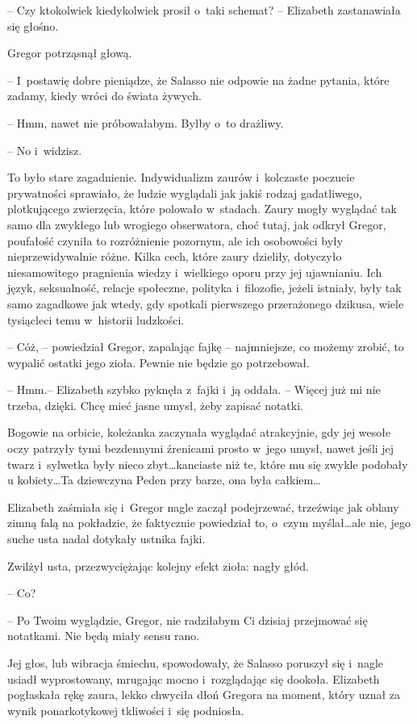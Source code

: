 \documentclass[oneside,polish,12pt,sfheadings]{mwbk}
\begin{document}
-- Czy ktokolwiek kiedykolwiek prosił o~taki schemat? -- Elizabeth
zastanawiała się głośno.

Gregor potrząsnął głową. 

-- I~postawię dobre pieniądze, że Salasso nie
odpowie na żadne pytania, które zadamy, kiedy wróci do świata żywych.

-- Hmm, nawet nie próbowałabym. Byłby o~to drażliwy.

-- No i~widzisz.

To było stare zagadnienie. Indywidualizm zaurów i~kolczaste poczucie
prywatności sprawiało, że ludzie wyglądali jak jakiś rodzaj gadatliwego,
plotkującego zwierzęcia, które polowało w~stadach. Zaury mogły wyglądać
tak samo dla zwykłego lub wrogiego obserwatora, choć tutaj, jak odkrył
Gregor, poufałość czyniła to rozróżnienie pozornym, ale ich osobowości
były nieprzewidywalnie różne. Kilka cech, które zaury dzieliły,
dotyczyło niesamowitego pragnienia wiedzy i~wielkiego oporu przy jej
ujawnianiu. Ich język, seksualność, relacje społeczne, polityka i~filozofie, jeżeli istniały, były tak samo zagadkowe jak wtedy, gdy
spotkali pierwszego przerażonego dzikusa, wiele tysiącleci temu w~historii ludzkości.

-- Cóż, -- powiedział Gregor, zapalając fajkę -- najmniejsze, co możemy
zrobić, to wypalić ostatki jego zioła. Pewnie nie będzie go potrzebował.

-- Hmm.-- Elizabeth szybko pyknęła z~fajki i~ją oddała. -- Więcej już mi
nie trzeba, dzięki. Chcę mieć jasne umysł, żeby zapisać notatki.

Bogowie na orbicie, koleżanka zaczynała wyglądać atrakcyjnie, gdy jej
wesołe oczy patrzyły tymi bezdennymi źrenicami prosto w~jego umysł,
nawet jeśli jej twarz i~sylwetka były nieco zbyt\ldots kanciaste niż te,
które mu się zwykle podobały u kobiety\ldots Ta dziewczyna Peden przy
barze, ona była całkiem\ldots

Elizabeth zaśmiała się i~Gregor nagle zaczął podejrzewać, trzeźwiąc jak
oblany zimną falą na pokładzie, że faktycznie powiedział to, o~czym
myślał\ldots ale nie, jego suche usta nadal dotykały ustnika fajki.

Zwilżył usta, przezwyciężając kolejny efekt zioła: nagły głód. 

-- Co?

-- Po Twoim wyglądzie, Gregor, nie radziłabym Ci dzisiaj przejmować się
notatkami. Nie będą miały sensu rano.

Jej głos, lub wibracja śmiechu, spowodowały, że Salasso poruszył się i~nagle usiadł wyprostowany, mrugając mocno i~rozglądając się dookoła.
Elizabeth pogłaskała rękę zaura, lekko chwyciła dłoń Gregora na moment,
który uznał za wynik ponarkotykowej tkliwości i~się podniosła.
\end{document}
